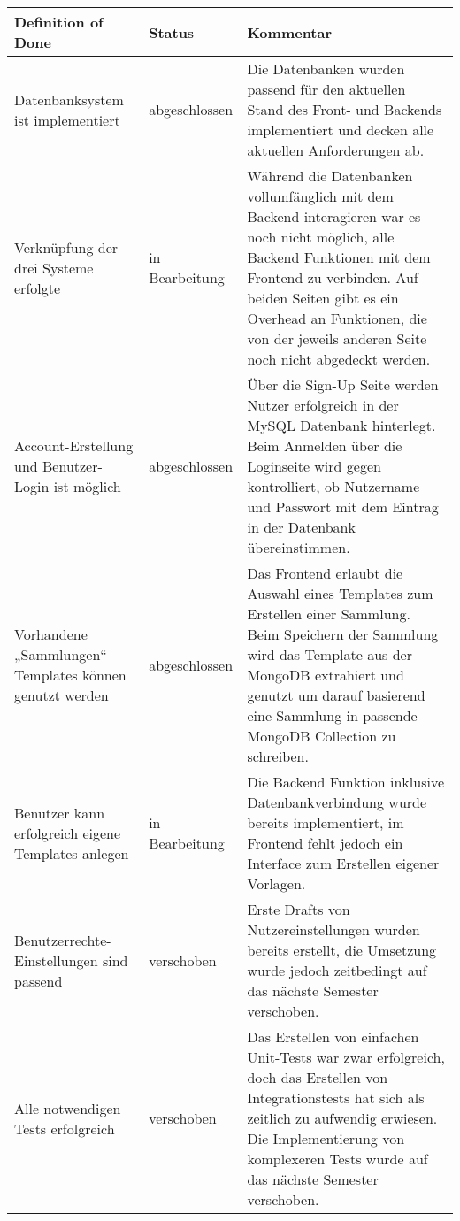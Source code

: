 \begin{table}[h!]
    \centering
    \renewcommand{\arraystretch}{1.5}
    \begin{tabular}{|p{}|p{}|p{}|}
        \hline
        \textbf{Definition of Done} & \textbf{Status} & \textbf{Kommentar} \\
        \hline
        Datenbanksystem ist implementiert & abgeschlossen & Die Datenbanken wurden passend für den aktuellen Stand des Front- und Backends implementiert und decken alle aktuellen Anforderungen ab. \\
        \hline
        Verknüpfung der drei Systeme erfolgte & in Bearbeitung & Während die Datenbanken vollumfänglich mit dem Backend interagieren war es noch nicht möglich, alle Backend Funktionen mit dem Frontend zu verbinden.
        Auf beiden Seiten gibt es ein Overhead an Funktionen, die von der jeweils anderen Seite noch nicht abgedeckt werden. \\
        \hline
        Account-Erstellung und Benutzer-Login ist möglich & abgeschlossen &  Über die Sign-Up Seite werden Nutzer erfolgreich in der MySQL Datenbank hinterlegt.
        Beim Anmelden über die Loginseite wird gegen kontrolliert, ob Nutzername und Passwort mit dem Eintrag in der Datenbank übereinstimmen.
        \\
        \hline
        Vorhandene „Sammlungen“-Templates können genutzt werden & abgeschlossen & Das Frontend erlaubt die Auswahl eines Templates zum Erstellen einer Sammlung.
        Beim Speichern der Sammlung wird das Template aus der MongoDB extrahiert und genutzt um darauf basierend eine Sammlung in passende MongoDB Collection zu schreiben.
        \\
        \hline
        Benutzer kann erfolgreich eigene Templates anlegen & in Bearbeitung & Die Backend Funktion inklusive Datenbankverbindung wurde bereits implementiert, im Frontend fehlt jedoch ein Interface zum Erstellen eigener Vorlagen. \\
        \hline
        Benutzerrechte-Einstellungen sind passend & verschoben & Erste Drafts von Nutzereinstellungen wurden bereits erstellt, die Umsetzung wurde jedoch zeitbedingt auf das nächste Semester verschoben. \\
        \hline
        Alle notwendigen Tests erfolgreich & verschoben & Das Erstellen von einfachen Unit-Tests war zwar erfolgreich, doch das Erstellen von Integrationstests hat sich als zeitlich zu aufwendig erwiesen.
        Die Implementierung von komplexeren Tests wurde auf das nächste Semester verschoben. \\
        \hline
    \end{tabular}
    \label{tab:definition-of-done-vergleich_2}
\end{table}
\newpage
